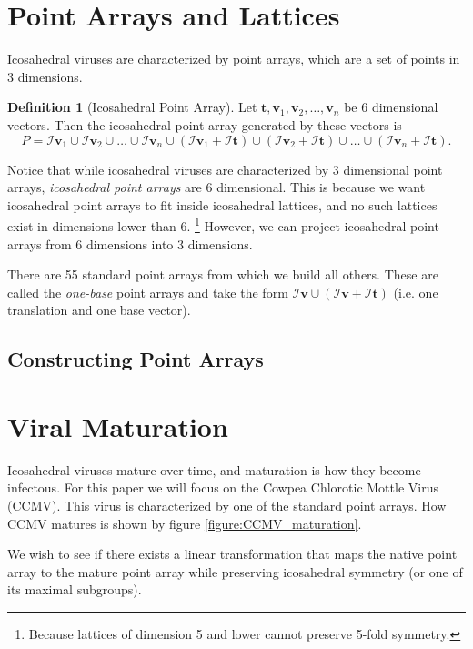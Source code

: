\documentclass[a4paper,10pt]{article}
\theoremstyle{plain}
\theoremstyle{definition}
\newtheorem{Definition}[Theorem]{Definition}
\theoremstyle{remark}
\renewcommand{\vec}[1]{\textbf{#1}}
\begin{document}
\section{Point Arrays and Lattices}
Icosahedral viruses are characterized by point arrays, which are a set of points in 3 dimensions.
\begin{Definition}[Icosahedral Point Array]
    Let \(\vec{t}, \vec{v}_1, \vec{v}_2, \dots, \vec{v}_n\) be 6 dimensional vectors.
    Then the icosahedral point array generated by these vectors is \[P = \mathcal{I}\vec{v}_1 \cup \mathcal{I}\vec{v}_2 \cup \dots \cup \mathcal{I}\vec{v}_n \cup (\mathcal{I}\vec{v}_1 + \mathcal{I}\vec{t}) \cup (\mathcal{I}\vec{v}_2 + \mathcal{I}\vec{t}) \cup \dots \cup (\mathcal{I}\vec{v}_n + \mathcal{I}\vec{t}).\]
\end{Definition}
Notice that while icosahedral viruses are characterized by 3 dimensional point arrays, \emph{icosahedral point arrays} are 6 dimensional.
This is because we want icosahedral point arrays to fit inside icosahedral lattices, and no such lattices exist in dimensions lower than 6. \footnote{Because lattices of dimension 5 and lower cannot preserve 5-fold symmetry.}
However, we can project icosahedral point arrays from 6 dimensions into 3 dimensions.

There are 55 standard point arrays from which we build all others.
These are called the \emph{one-base} point arrays and take the form \(\mathcal{I}\vec{v} \cup (\mathcal{I}\vec{v} + \mathcal{I}\vec{t})\) (i.e. one translation and one base vector). \cite{keeftwarock2009affine}

\subsection{Constructing Point Arrays}

\section{Viral Maturation}
Icosahedral viruses mature over time, and maturation is how they become infectous.
For this paper we will focus on the Cowpea Chlorotic Mottle Virus (CCMV).
This virus is characterized by one of the standard point arrays.
How CCMV matures is shown by figure \ref{figure:CCMV_maturation}.

We wish to see if there exists a linear transformation that maps the native point array to the mature point array while preserving icosahedral symmetry (or one of its maximal subgroups).
\end{document}
